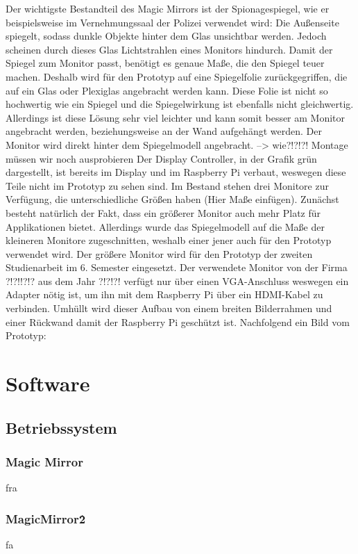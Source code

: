 \documentclass[12pt,a4paper]{report}
\begin{document}
Der wichtigste Bestandteil des Magic Mirrors ist der Spionagespiegel, wie er beispielsweise im Vernehmungssaal der Polizei verwendet wird: Die Außenseite spiegelt, sodass dunkle Objekte hinter dem Glas unsichtbar werden. Jedoch scheinen durch dieses Glas Lichtstrahlen eines Monitors hindurch. Damit der Spiegel zum Monitor passt, benötigt es genaue Maße, die den Spiegel teuer machen. Deshalb wird für den Prototyp auf eine Spiegelfolie zurückgegriffen, die auf ein Glas oder Plexiglas angebracht werden kann. Diese Folie ist nicht so hochwertig wie ein Spiegel und die Spiegelwirkung ist ebenfalls nicht gleichwertig. Allerdings ist diese Lösung sehr viel leichter und kann somit besser am Monitor angebracht werden, beziehungsweise an der Wand aufgehängt werden. 
Der Monitor wird direkt hinter dem Spiegelmodell angebracht. --> wie?!?!?! Montage müssen wir noch ausprobieren
Der Display Controller, in der Grafik grün dargestellt, ist bereits im Display und im Raspberry Pi verbaut, weswegen diese Teile nicht im Prototyp zu sehen sind. 
Im Bestand stehen drei Monitore zur Verfügung, die unterschiedliche Größen haben (Hier Maße einfügen). Zunächst besteht natürlich der Fakt, dass ein größerer Monitor auch mehr Platz für Applikationen bietet. Allerdings wurde das Spiegelmodell auf die Maße der kleineren Monitore zugeschnitten, weshalb einer jener auch für den Prototyp verwendet wird. Der größere Monitor wird für den Prototyp der zweiten Studienarbeit im 6. Semester eingesetzt.
Der verwendete Monitor von der Firma ?!?!!?!? aus dem Jahr ?!?!?! verfügt nur über einen VGA-Anschluss weswegen ein Adapter nötig ist, um ihn mit dem Raspberry Pi über ein HDMI-Kabel zu verbinden. 
Umhüllt wird dieser Aufbau von einem breiten Bilderrahmen und einer Rückwand damit der Raspberry Pi geschützt ist. 
Nachfolgend ein Bild vom Prototyp:

\chapter{Software}
\section{Betriebssystem}
\subsection*{Magic Mirror}
fra
\subsection*{MagicMirror\^2}
fa
\end{document}
